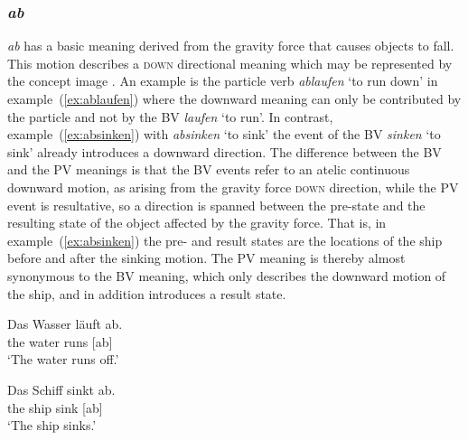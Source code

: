 \documentclass[output=paper]{langsci/langscibook}
\begin{document}
\subsubsection{\textit{ab}}

\textit{ab} has a basic meaning derived from the gravity force that
causes objects to fall. This motion describes a \textsc{down}
directional meaning which may be represented by the concept image
. An example is the particle verb \textit{ablaufen}
`to run down' in example~(\ref{ex:ablaufen}) where the downward
meaning can only be contributed by the particle and not by the BV
\textit{laufen} `to run'. In contrast, example~(\ref{ex:absinken})
with \textit{absinken} `to sink'
the event of the BV \textit{sinken} `to sink'
already introduces a downward direction. The difference between the BV
and the PV meanings is that the BV events refer to an atelic
continuous downward motion, as arising from the gravity force
\textsc{down} direction, while the PV event is resultative, so a
direction is spanned between the pre-state and the resulting state of
the object affected by the gravity force. That is, in
example~(\ref{ex:absinken}) the pre- and result states are the
locations of the ship before and after the sinking motion. The PV
meaning is thereby almost synonymous to the BV meaning, which only
describes the downward motion of the ship, and in addition introduces
a result state.

\ea\label{ex:ablaufen}
\gll Das Wasser läuft ab.\\
the water runs [ab]\\
\glt `The water runs off.'
\z

\ea\label{ex:absinken}
\gll Das Schiff sinkt ab.\\
the ship sink [ab]\\
\glt `The ship sinks.'
\z
  
\end{document}
